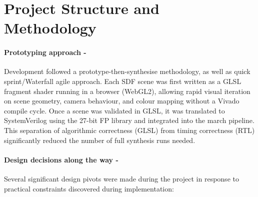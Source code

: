 \section{Project Structure and Methodology}

\paragraph{Prototyping approach -}
Development followed a prototype-then-synthesise methodology, as well as quick sprint/Waterfall agile approach. Each SDF scene
was first written as a GLSL fragment shader running in a browser (WebGL2),
allowing rapid visual iteration on scene geometry, camera behaviour, and
colour mapping without a Vivado compile cycle. Once a scene was validated in
GLSL, it was translated to SystemVerilog using the 27-bit FP library and
integrated into the march pipeline. This separation of algorithmic
correctness (GLSL) from timing correctness (RTL) significantly reduced the
number of full synthesis runs needed.

\paragraph{Design decisions along the way -}
Several significant design pivots were made during the project in response to
practical constraints discovered during implementation:

